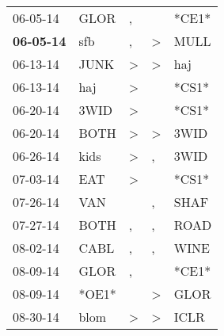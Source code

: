 \begin{supertabular}{p{0.07\textwidth}p{0.06\textwidth}p{0.02\textwidth}p{0.02\textwidth}p{0.06\textwidth}}
          06-05-14\textsuperscript{} &           GLOR\textsuperscript{} &                , &                  &                            *CE1* \\
 \textbf{06-05-14\textsuperscript{}} &            sfb\textsuperscript{} &                , &     \textgreater &           MULL\textsuperscript{} \\
          06-13-14\textsuperscript{} &           JUNK\textsuperscript{} &     \textgreater &     \textgreater &            haj\textsuperscript{} \\
          06-13-14\textsuperscript{} &            haj\textsuperscript{} &     \textgreater &                  &                            *CS1* \\
          06-20-14\textsuperscript{} &           3WID\textsuperscript{} &     \textgreater &                  &                            *CS1* \\
          06-20-14\textsuperscript{} &           BOTH\textsuperscript{} &     \textgreater &     \textgreater &           3WID\textsuperscript{} \\
          06-26-14\textsuperscript{} &           kids\textsuperscript{} &     \textgreater &                , &           3WID\textsuperscript{} \\
          07-03-14\textsuperscript{} &            EAT\textsuperscript{} &     \textgreater &                  &                            *CS1* \\
          07-26-14\textsuperscript{} &            VAN\textsuperscript{} &                  &                , &           SHAF\textsuperscript{} \\
          07-27-14\textsuperscript{} &           BOTH\textsuperscript{} &                , &                , &           ROAD\textsuperscript{} \\
          08-02-14\textsuperscript{} &           CABL\textsuperscript{} &                , &                , &           WINE\textsuperscript{} \\
          08-09-14\textsuperscript{} &           GLOR\textsuperscript{} &                , &                  &                            *CE1* \\
          08-09-14\textsuperscript{} &                            *OE1* &                  &     \textgreater &           GLOR\textsuperscript{} \\
          08-30-14\textsuperscript{} &           blom\textsuperscript{} &     \textgreater &     \textgreater &           ICLR\textsuperscript{} \\

\end{supertabular}
